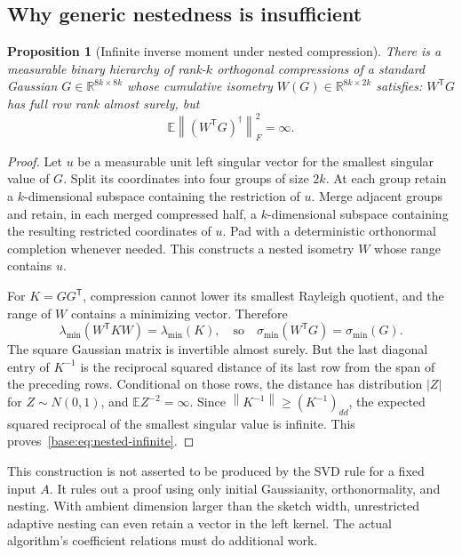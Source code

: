 \documentclass[11pt,oneside,openany,a4paper]{book}
\numberwithin{equation}{chapter}
\newtheorem{proposition}[theorem]{Proposition}
\theoremstyle{definition}
\theoremstyle{remark}
\newcommand{\R}{\mathbb R}\newcommand{\E}{\mathbb E}\newcommand{\Prb}{\mathbb P}\newcommand{\PP}{\mathbb P}
\newcommand{\T}{\mathsf T}\newcommand{\Id}{I}
\newcommand{\F}[1]{\left\lVert#1\right\rVert_F}
\newcommand{\N}[1]{\left\lVert#1\right\rVert}
\begin{document}
\subsection{Why generic nestedness is insufficient}
\begin{proposition}[Infinite inverse moment under nested compression]
\label{base:prop:nested-obstruction}
There is a measurable binary hierarchy of rank-$k$ orthogonal compressions
of a standard Gaussian $G\in\R^{8k\times8k}$ whose cumulative isometry
$W(G)\in\R^{8k\times2k}$ satisfies: $W^{\T}G$ has full row rank almost surely,
but
\begin{equation}\label{base:eq:nested-infinite}
 \E\F{(W^{\T}G)^\dagger}^2=\infty.
\end{equation}
\end{proposition}
\begin{proof}
Let $u$ be a measurable unit left singular vector for the smallest singular
value of $G$. Split its coordinates into four groups of size $2k$. At each
group retain a $k$-dimensional subspace containing the restriction of $u$.
Merge adjacent groups and retain, in each merged compressed half, a
$k$-dimensional subspace containing the resulting restricted coordinates of
$u$. Pad with a deterministic orthonormal completion whenever needed. This
constructs a nested isometry $W$ whose range contains $u$.

For $K=GG^{\T}$, compression cannot lower its smallest Rayleigh quotient, and
the range of $W$ contains a minimizing vector. Therefore
\[
 \lambda_{\min}(W^{\T}KW)=\lambda_{\min}(K),
 \quad\text{so}\quad
 \sigma_{\min}(W^{\T}G)=\sigma_{\min}(G).
\]
The square Gaussian matrix is invertible almost surely. But the last
diagonal entry of $K^{-1}$ is the reciprocal squared distance of its last
row from the span of the preceding rows. Conditional on those rows, the
distance has distribution $|Z|$ for $Z\sim N(0,1)$, and $\E Z^{-2}=\infty$.
Since $\N{K^{-1}}\ge(K^{-1})_{dd}$, the expected squared reciprocal of the
smallest singular value is infinite. This proves~\eqref{base:eq:nested-infinite}.
\end{proof}

This construction is not asserted to be produced by the SVD rule for a
fixed input $A$. It rules out a proof using only initial Gaussianity,
orthonormality, and nesting. With ambient dimension larger than the sketch
width, unrestricted adaptive nesting can even retain a vector in the left
kernel. The actual algorithm's coefficient relations must do additional work.
\end{document}
